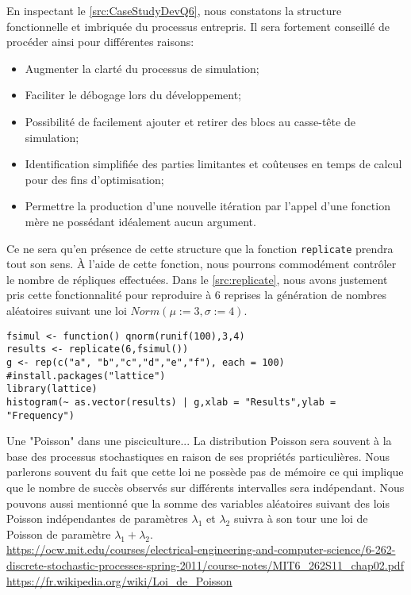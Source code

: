 En inspectant le \autoref{src:CaseStudyDevQ6}, nous constatons la structure fonctionnelle et imbriquée du processus entrepris. Il sera fortement conseillé de procéder ainsi pour différentes raisons:

\begin{itemize}
	\item Augmenter la clarté du processus de simulation;
	\item Faciliter le débogage lors du développement;
	\item Possibilité de facilement ajouter et retirer des blocs au casse-tête de simulation;
	\item Identification simplifiée des parties limitantes et coûteuses en temps de calcul pour des fins d'optimisation;
	\item Permettre la production d'une nouvelle itération par l'appel d'une fonction mère ne possédant idéalement aucun argument.
\end{itemize}

Ce ne sera qu'en présence de cette structure que la fonction \texttt{replicate} prendra tout son sens. À l'aide de cette fonction, nous pourrons commodément contrôler le nombre de répliques effectuées. Dans le \autoref{src:replicate}, nous avons justement pris cette fonctionnalité pour reproduire à 6 reprises la génération de nombres aléatoires suivant une loi $Norm(\mu := 3, \sigma := 4)$.

\begin{lstlisting}[caption = Replication d'une analyse stochastique,label=src:replicate]
fsimul <- function() qnorm(runif(100),3,4)
results <- replicate(6,fsimul())
g <- rep(c("a", "b","c","d","e","f"), each = 100)
#install.packages("lattice")
library(lattice)
histogram(~ as.vector(results) | g,xlab = "Results",ylab = "Frequency") 
\end{lstlisting}


\begin{moreInfo}{Une "Poisson" dans une pisciculture...}
	La distribution Poisson sera souvent à la base des processus stochastiques en raison de ses propriétés particulières. Nous parlerons souvent du fait que cette loi ne possède pas de mémoire ce qui implique que le nombre de succès observés sur différents intervalles sera indépendant. Nous pouvons aussi mentionné que la somme des variables aléatoires suivant des lois Poisson indépendantes de paramètres $\lambda_1$ et $\lambda_2$ suivra à son tour une loi de Poisson de paramètre $\lambda_1 + \lambda_2$. \\
	\url{https://ocw.mit.edu/courses/electrical-engineering-and-computer-science/6-262-discrete-stochastic-processes-spring-2011/course-notes/MIT6_262S11_chap02.pdf} \\
	\url{https://fr.wikipedia.org/wiki/Loi_de_Poisson}
\end{moreInfo}